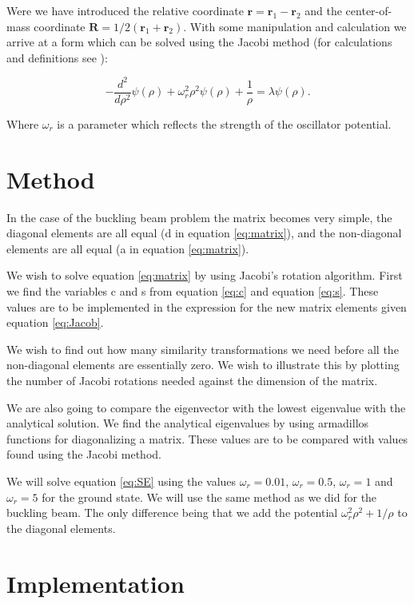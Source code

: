 \documentclass[norsk,a4paper,12pt]{article}
\begin{document}
Were we have introduced the relative coordinate $\mathbf{r} = \mathbf{r}_1-\mathbf{r}_2$
and the center-of-mass coordinate $\mathbf{R}=1/2(\mathbf{r}_1+\mathbf{r}_2)$. With some manipulation and calculation we arrive at a form which can be solved using the Jacobi method (for calculations and definitions see \cite{94}):

\begin{equation}
  -\frac{d^2}{d\rho^2} \psi(\rho) + \omega_r^2\rho^2\psi(\rho) +\frac{1}{\rho} = \lambda \psi(\rho).
\label{eq:SE}
\end{equation}

Where $\omega_r$ is a parameter which reflects the strength of the oscillator potential.

\section{Method}


In the case of the buckling beam problem the matrix becomes very simple, the diagonal elements are all equal (d in equation \ref{eq:matrix}), and the non-diagonal elements are all equal (a in equation \ref{eq:matrix}). 

We wish to solve equation \ref{eq:matrix} by using Jacobi's rotation algorithm. First we find the variables c and s from equation \ref{eq:c} and equation \ref{eq:s}. These values are to be implemented in the expression for the new matrix elements given equation \ref{eq:Jacob}.

We wish to find out how many similarity transformations we need before all the non-diagonal elements are essentially zero. We wish to illustrate this by plotting the number of Jacobi rotations needed against the dimension of the matrix. 

We are also going to compare the eigenvector with the lowest eigenvalue with the analytical solution. We find the analytical eigenvalues by using armadillos functions for diagonalizing a matrix. These values are to be compared with values found using the Jacobi method. 


We will solve equation \ref{eq:SE} using the values $\omega_r = 0.01$, $\omega_r = 0.5$, $\omega_r =1$ and $\omega_r = 5$ for the ground state. We will use the same method as we did for the buckling beam. The only difference being that we add the potential $\omega_r^2\rho^2+1/\rho$ to the diagonal elements.

\section{Implementation}
\end{document}
